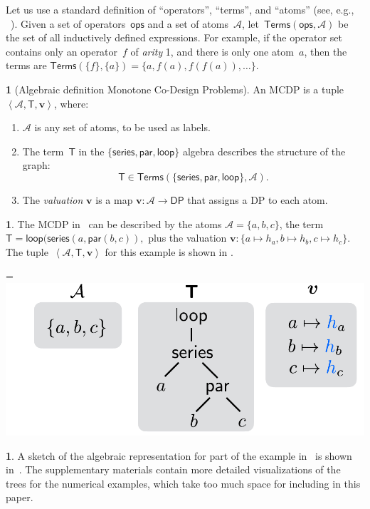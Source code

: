 \documentclass[twocolumn,english]{IEEEconf}
\theoremstyle{plain}
\theoremstyle{definition}
\newtheorem{example}[thm]{\protect\examplename}
\theoremstyle{definition}
\newtheorem{defn}[thm]{\protect\definitionname}
\theoremstyle{plain}
\newcommand{\aword}[1]{\mathsf{#1}}
\newcommand{\vmath}[1]{\aword{#1}}
\newcommand{\ftor}{{h}}
\newcommand{\dpseries}{\vmath{series}}
\newcommand{\dppar}{\vmath{par}}
\newcommand{\dploop}{\vmath{loop}}
\newcommand{\dpsp}{\vmath{DP}}
\newcommand{\terms}{\vmath{Terms}}
\newcommand{\atoms}{\mathcal{A}}
\newcommand{\atree}{\boldsymbol{\vmath{T}}}
\newcommand{\val}{\boldsymbol{v}}
\newcommand{\ops}{\vmath{ops}}
\newcommand*{\vcenteredhbox}[1]{\begingroup
\setbox0=\hbox{#1}\parbox{\wd0}{\box0}\endgroup}
\newcommand{\captionsideleft}[2]{
    \medskip
    \begin{minipage}{1.8cm}{
        \hfill
        \protect\captionof{figure}{#1}}\end{minipage}
    \begin{minipage}{6.6cm}
    
    \vcenteredhbox{{#2}}
    \hfill
    \end{minipage}
    \medskip
}
\providecommand{\definitionname}{Definition}
\providecommand{\examplename}{Example}
\begin{document}
Let us use a standard definition of ``operators'', ``terms'',
and ``atoms'' (see, e.g., ~\cite[p.41]{jezek08}). Given a set
of operators~$\ops$ and a set of atoms~$\atoms$, let~$\terms(\ops,\atoms)$
be the set of all inductively defined expressions. For example, if
the operator set contains only an operator~$f$ of \emph{arity} 1,
and there is only one atom~$a$, then the terms are $\terms(\{f\},\{a\})=\{a,f(a),f(f(a)),\dots\}.$ 



\begin{defn}[Algebraic definition Monotone Co-Design Problems]
\label{def:MCDP-algebraic}An MCDP is a tuple~$\left\langle \atoms,\atree,\val\right\rangle $,
where:
\begin{enumerate}
\item $\atoms$ is any set of atoms, to be used as labels.
\item The term~$\atree$ in the $\{\dpseries,\dppar,\dploop\}$ algebra
describes the structure of the graph:
\[
\atree\in\terms(\{\dpseries,\dppar,\dploop\},\atoms).
\]
\item The \emph{valuation} $\val$ is a map $\val:\atoms\rightarrow\dpsp$
that assigns a DP to each atom.
\end{enumerate}
\end{defn}
\begin{example}
The MCDP in~ can be described by the atoms
$\atoms=\{a,b,c\}$, the term $\atree=\dploop(\dpseries(a,\dppar(b,c)),$
plus the valuation $\val:\{a\mapsto\ftor_{a},b\mapsto\ftor_{b},c\mapsto\ftor_{c}\}.$
The tuple~$\left\langle \atoms,\atree,\val\right\rangle $ for this
example is shown in .
\end{example}
\captionsideleft{\label{fig:example-b}}{\includegraphics[scale=0.33]{unc_atoms_g_v}}
\begin{example}
A sketch of the algebraic representation for part of the example in~
is shown in~. The supplementary materials contain
more detailed visualizations of the trees for the numerical examples,
which take too much space for including in this paper.
\end{example}
\end{document}
